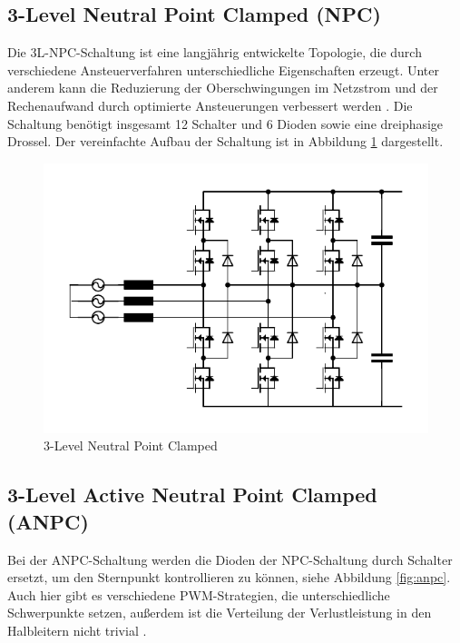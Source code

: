 	\subsection{3-Level Neutral Point Clamped (NPC)}
		Die 3L-\gls{NPC}-Schaltung ist eine langjährig entwickelte Topologie, die durch verschiedene Ansteuerverfahren unterschiedliche Eigenschaften erzeugt. Unter anderem kann die Reduzierung der Oberschwingungen im Netzstrom und der Rechenaufwand durch optimierte Ansteuerungen verbessert werden \cite{NPC}. Die Schaltung benötigt insgesamt 12 Schalter und 6 Dioden sowie eine dreiphasige Drossel. Der vereinfachte Aufbau der Schaltung ist in Abbildung \ref{fig:3l-npc} dargestellt.
		\begin{figure}
			\centering
			\includegraphics[width=1\linewidth]{content/Grafiken/3L-NPC}
			\caption{3-Level Neutral Point Clamped}
			\label{fig:3l-npc}
		\end{figure}

	\subsection{3-Level Active Neutral Point Clamped (ANPC)}
		Bei der \gls{ANPC}-Schaltung werden die Dioden der \gls{NPC}-Schaltung durch Schalter ersetzt, um den Sternpunkt kontrollieren zu können, siehe Abbildung \ref{fig:anpc}. Auch hier gibt es verschiedene \gls{PWM}-Strategien, die unterschiedliche Schwerpunkte setzen, außerdem ist die Verteilung der Verlustleistung in den Halbleitern nicht trivial \cite{ANPC}.
	
